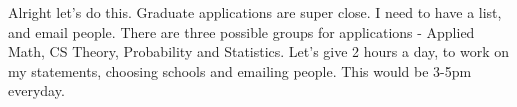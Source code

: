 \noindent {}

Alright let's do this. Graduate applications are super close. I need to have a list, and email people. There are three possible groups for applications - Applied Math, CS Theory, Probability and Statistics. Let's give 2 hours a day, to work on my statements, choosing schools and emailing people. This would be 3-5pm everyday.

